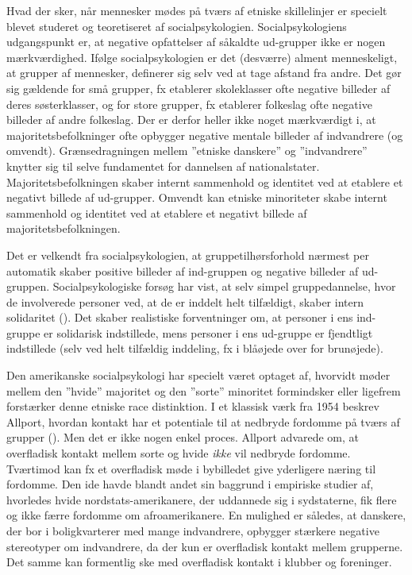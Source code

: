 \documentclass[
]{book}
\begin{document}
Hvad der sker, når mennesker mødes på tværs af etniske skillelinjer er specielt blevet studeret og teoretiseret af socialpsykologien. Socialpsykologiens udgangspunkt er, at negative opfattelser af såkaldte ud-grupper ikke er nogen mærkværdighed. Ifølge socialpsykologien er det (desværre) alment menneskeligt, at grupper af mennesker, definerer sig selv ved at tage afstand fra andre. Det gør sig gældende for små grupper, fx etablerer skoleklasser ofte negative billeder af deres søsterklasser, og for store grupper, fx etablerer folkeslag ofte negative billeder af andre folkeslag. Der er derfor heller ikke noget mærkværdigt i, at majoritetsbefolkninger ofte opbygger negative mentale billeder af indvandrere (og omvendt). Grænsedragningen mellem ''etniske danskere'' og ''indvandrere'' knytter sig til selve fundamentet for dannelsen af nationalstater. Majoritetsbefolkningen skaber internt sammenhold og identitet ved at etablere et negativt billede af ud-grupper. Omvendt kan etniske minoriteter skabe internt sammenhold og identitet ved at etablere et negativt billede af majoritetsbefolkningen.

Det er velkendt fra socialpsykologien, at gruppetilhørsforhold nærmest per automatik skaber positive billeder af ind-gruppen og negative billeder af ud-gruppen. Socialpsykologiske forsøg har vist, at selv simpel gruppedannelse, hvor de involverede personer ved, at de er inddelt helt tilfældigt, skaber intern solidaritet (). Det skaber realistiske forventninger om, at personer i ens ind-gruppe er solidarisk indstillede, mens personer i ens ud-gruppe er fjendtligt indstillede (selv ved helt tilfældig inddeling, fx i blåøjede over for brunøjede).

Den amerikanske socialpsykologi har specielt været optaget af, hvorvidt møder mellem den ''hvide'' majoritet og den ''sorte'' minoritet formindsker eller ligefrem forstærker denne etniske race distinktion. I et klassisk værk fra 1954 beskrev Allport, hvordan kontakt har et potentiale til at nedbryde fordomme på tværs af grupper (). Men det er ikke nogen enkel proces. Allport advarede om, at overfladisk kontakt mellem sorte og hvide \emph{ikke} vil nedbryde fordomme. Tværtimod kan fx et overfladisk møde i bybilledet give yderligere næring til fordomme. Den ide havde blandt andet sin baggrund i empiriske studier af, hvorledes hvide nordstats-amerikanere, der uddannede sig i sydstaterne, fik flere og ikke færre fordomme om afroamerikanere. En mulighed er således, at danskere, der bor i boligkvarterer med mange indvandrere, opbygger stærkere negative stereotyper om indvandrere, da der kun er overfladisk kontakt mellem grupperne. Det samme kan formentlig ske med overfladisk kontakt i klubber og foreninger.
\end{document}

